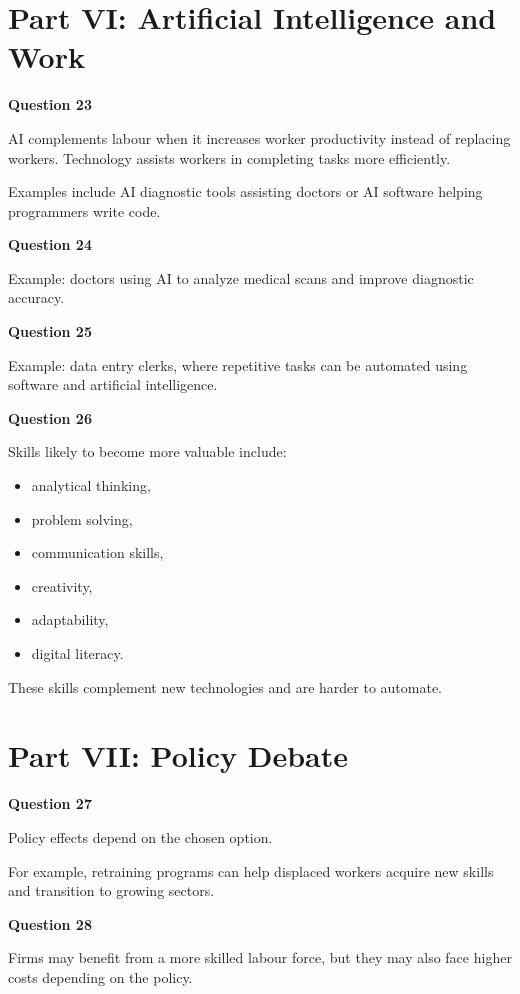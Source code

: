 \documentclass[12pt]{article}
\begin{document}
\section*{Part VI: Artificial Intelligence and Work}

\textbf{Question 23}

AI complements labour when it increases worker productivity instead of replacing workers. Technology assists workers in completing tasks more efficiently.

Examples include AI diagnostic tools assisting doctors or AI software helping programmers write code.

\textbf{Question 24}

Example: doctors using AI to analyze medical scans and improve diagnostic accuracy.

\textbf{Question 25}

Example: data entry clerks, where repetitive tasks can be automated using software and artificial intelligence.

\textbf{Question 26}

Skills likely to become more valuable include:

\begin{itemize}
\item analytical thinking,
\item problem solving,
\item communication skills,
\item creativity,
\item adaptability,
\item digital literacy.
\end{itemize}

These skills complement new technologies and are harder to automate.

\section*{Part VII: Policy Debate}

\textbf{Question 27}

Policy effects depend on the chosen option.

For example, retraining programs can help displaced workers acquire new skills and transition to growing sectors.

\textbf{Question 28}

Firms may benefit from a more skilled labour force, but they may also face higher costs depending on the policy.
\end{document}
